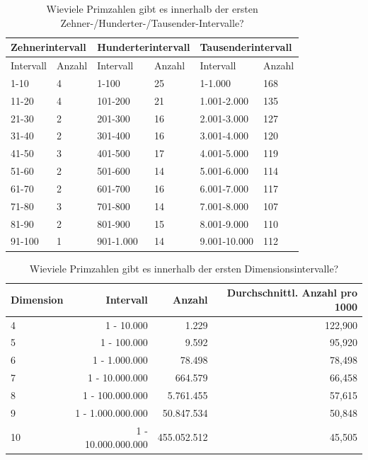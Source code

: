 \begin{refsegment}
\begin{table}[ht]
\begin{center}
\begin{tabular}{|l|l||l|l||l|l|}\hline
\multicolumn{2}{|l||}{Zehnerintervall} & \multicolumn{2}{l||}{Hunderterintervall} & \multicolumn{2}{l|}{Tausenderintervall} \\ \hline
Intervall  &     Anzahl &    Intervall  &  Anzahl &  Intervall  &    Anzahl\\ \hline \hline
1-10     &       4     &     1-100   &     25  &     1-1.000     &    168 \\
11-20    &       4     &     101-200 &     21  &     1.001-2.000  &    135 \\
21-30    &       2     &     201-300 &     16  &     2.001-3.000  &    127  \\
31-40    &       2     &     301-400 &     16  &     3.001-4.000  &    120 \\
41-50    &       3     &     401-500 &     17  &     4.001-5.000  &    119 \\
51-60    &       2     &     501-600 &     14  &     5.001-6.000  &    114 \\
61-70    &       2     &     601-700 &     16  &     6.001-7.000  &    117 \\
71-80    &       3     &     701-800 &     14  &     7.001-8.000  &    107 \\
81-90    &       2     &     801-900 &     15  &     8.001-9.000  &    110 \\
91-100   &       1     &     901-1.000 &     14 &     9.001-10.000 &    112 \\ \hline
\end{tabular}
\caption{Wieviele Primzahlen gibt es innerhalb der ersten Zehner-/Hunderter-/Tausender-Intervalle?}
\end{center}
\end{table}


\begin{table}[ht]
\begin{center}
\begin{tabular}{|l|r|r|r|}\hline
Dimension & Intervall & Anzahl & Durchschnittl. Anzahl pro 1000 \\ \hline
  4  &  1 - 10.000           &   1.229       &    122,900 \\
  5  &  1 - 100.000          &   9.592       &     95,920 \\
  6  &  1 - 1.000.000        &   78.498      &     78,498 \\
  7  &  1 - 10.000.000       &   664.579     &     66,458 \\
  8  &  1 - 100.000.000      &   5.761.455   &     57,615 \\
  9  &  1 - 1.000.000.000    &   50.847.534  &     50,848 \\
 10  &  1 - 10.000.000.000   &   455.052.512 &     45,505 \\ \hline
\end{tabular}
\caption{Wieviele Primzahlen gibt es innerhalb der ersten Dimensionsintervalle?}
\end{center}
\end{table}


\end{refsegment}
